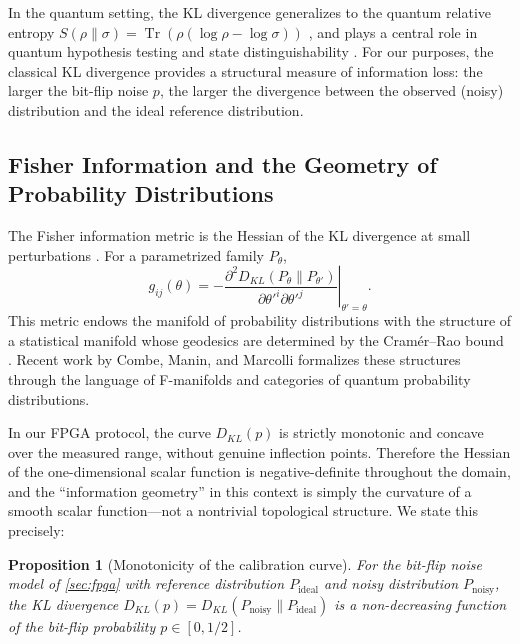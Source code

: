 \documentclass[12pt,a4paper,oneside]{book}
\theoremstyle{plain}
\newtheorem{proposition}[theorem]{Proposition}
\theoremstyle{definition}
\theoremstyle{remark}
\begin{document}
In the quantum setting, the KL divergence generalizes to the quantum relative entropy $S(\rho \| \sigma) = \operatorname{Tr}(\rho (\log \rho - \log \sigma))$ \cite{umegaki1962conditional, nielsen2010quantum}, and plays a central role in quantum hypothesis testing and state distinguishability \cite{flammia2024chisq}. For our purposes, the classical KL divergence provides a structural measure of information loss: the larger the bit-flip noise $p$, the larger the divergence between the observed (noisy) distribution and the ideal reference distribution.

\subsection{Fisher Information and the Geometry of Probability Distributions}

The Fisher information metric is the Hessian of the KL divergence at small perturbations \cite{amari2007methods, combe2022geometry}. For a parametrized family $P_\theta$,
\begin{equation}
    g_{ij}(\theta) = - \left. \frac{\partial^2 D_{KL}(P_\theta \| P_{\theta'})}{\partial \theta'^i \partial \theta'^j} \right|_{\theta' = \theta}.
\end{equation}
This metric endows the manifold of probability distributions with the structure of a statistical manifold whose geodesics are determined by the Cram\'er--Rao bound \cite{amari2007methods}. Recent work by Combe, Manin, and Marcolli \cite{combe2022geometry} formalizes these structures through the language of F-manifolds and categories of quantum probability distributions.

In our FPGA protocol, the curve $D_{KL}(p)$ is strictly monotonic and concave over the measured range, without genuine inflection points. Therefore the Hessian of the one-dimensional scalar function is negative-definite throughout the domain, and the ``information geometry'' in this context is simply the curvature of a smooth scalar function---not a nontrivial topological structure. We state this precisely:

\begin{proposition}[Monotonicity of the calibration curve]\label{prop:monotonicity}
For the bit-flip noise model of \cref{sec:fpga} with reference distribution $P_{\text{ideal}}$ and noisy distribution $P_{\text{noisy}}$, the KL divergence $D_{KL}(p) = D_{KL}(P_{\text{noisy}} \| P_{\text{ideal}})$ is a non-decreasing function of the bit-flip probability $p \in [0, 1/2]$.
\end{proposition}
\end{document}
